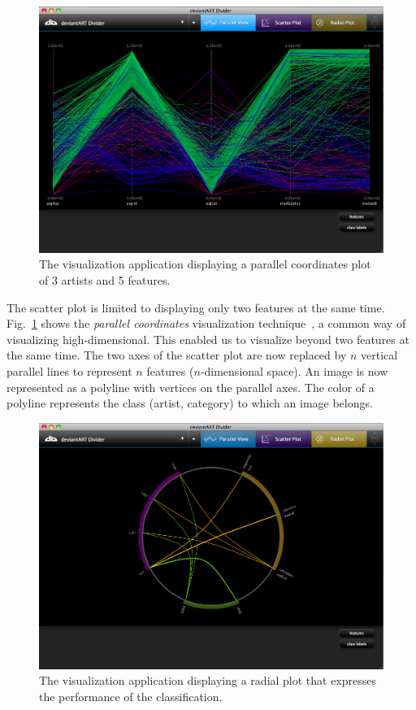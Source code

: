 \begin{figure}[htb]
  \centering
  \includegraphics[width=1\linewidth]{img/visualization_parallel.png}
  \caption{The visualization application displaying a parallel coordinates plot of 3 artists and 5 features.}
  \label{fig:visualization_parallel}
\end{figure}

The scatter plot is limited to displaying only two features at the same time.
Fig.~\ref{fig:visualization_parallel} shows the \textit{parallel coordinates} visualization technique~\cite{andrienko2001constructing}, a common way of visualizing high-dimensional.
This enabled us to visualize beyond two features at the same time.
The two axes of the scatter plot are now replaced by $n$ vertical parallel lines to represent $n$ features ($n$-dimensional space).
An image is now represented as a polyline with vertices on the parallel axes.
The color of a polyline represents the class (artist, category) to which an image belongs.

\begin{figure}[htb]
  \centering
  \includegraphics[width=1\linewidth]{img/visualization_radial.png}
  \caption{The visualization application displaying a radial plot that expresses the performance of the classification.}
  \label{fig:visualization_radial}
\end{figure}


